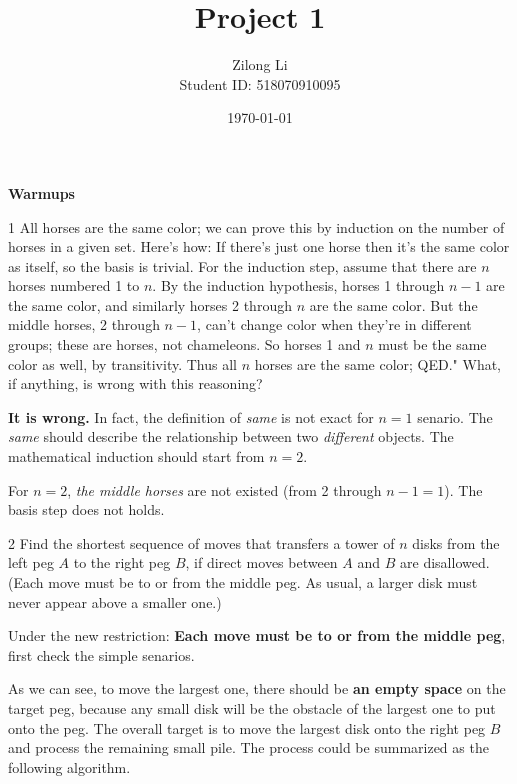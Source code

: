 \documentclass[a4paper,12pt]{article}
\title{Project 1}
\author{Zilong Li\\\small Student ID: 518070910095}
\date{\today}
\makeatletter
\newtheorem*{solution}{Solution}
\theoremstyle{definition}
\renewenvironment{solution}[1][Solution] {\par\pushQED{\qed}\normalfont\topsep6\p@\@plus6\p@\relax\trivlist\item[\hskip\labelsep\bfseries#1\@addpunct{.}]\ignorespaces}{\popQED\endtrivlist\@endpefalse} \makeatother
\newenvironment{problems}{\begin{list}{}{\renewcommand{\makelabel}[1]{\textbf{##1}\hfil}}}{\end{list}}
\makeatother
\begin{document}
\maketitle

\noindent\textbf{Warmups}

\begin{problems}
    \item[1] All horses are the same color; we can prove this by induction on the number of horses in a given set. Here's how: If there's just one horse then it's the same color as itself, so the basis is trivial. 
    For the induction step, assume that there are $n$ horses numbered 1 to $n$. By the induction hypothesis, horses 1 through $n - 1$ are the same color, and similarly horses 2 through $n$ are the same color. 
    But the middle horses, 2 through $n - 1$, can't change color when they're in different groups; these are horses, not chameleons. 
    So horses 1 and $n$ must be the same color as well, by transitivity. Thus all $n$ horses are the same color; QED." What, if anything, is wrong with this reasoning?
    \begin{solution}
        \textbf{It is wrong.} In fact, the definition of \emph{same} is not exact for $n=1$ senario. The \emph{same} should describe the relationship between two \emph{different} objects. The mathematical induction should start from $n=2$.

        For $n=2$, \emph{the middle horses} are not existed (from 2 through $n-1=1$). The basis step does not holds.
    \end{solution}

    \item[2] Find  the  shortest  sequence  of  moves  that  transfers  a  tower  of $n$ disks from the left peg $A$ to the right peg $B$, if direct moves between $A$ and $B$ are disallowed. (Each move must be to or from the middle peg. As usual, a larger disk must never appear above a smaller one.)
    
    \begin{solution}
        Under the new restriction: \textbf{Each move must be to or from the middle peg}, first check the simple senarios.
        
        

        As we can see, to move the largest one, there should be \textbf{an empty space} on the target peg, because any small disk will be the obstacle of the largest one to put onto the peg. The overall target is to move the largest disk onto the right peg $B$ and process the remaining small pile. The process could be summarized as the following algorithm.


\end{solution}
\end{problems}
\end{document}
